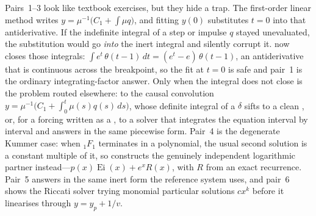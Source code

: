 \begin{codepairs}
\end{codepairs}

Pairs~1--3 look like textbook exercises, but they hide a trap. The first-order
linear method writes \(y=\mu^{-1}\bigl(C_1+\int\mu q\bigr)\), and fitting \(y(0)\)
substitutes \(t=0\) into that antiderivative. If the indefinite integral of a step
or impulse \(q\) stayed unevaluated, the substitution would go \emph{into} the inert
integral and silently corrupt it.  now closes those integrals:
\(\int e^{t}\,\theta(t-1)\,dt = (e^{t}-e)\,\theta(t-1)\), an antiderivative that is
continuous across the breakpoint, so the fit at \(t=0\) is safe and pair~1 is the
ordinary integrating-factor answer. Only when the integral does not close is the
problem routed elsewhere: to the causal convolution
\(y=\mu^{-1}\bigl(C_1+\int_0^t\mu(s)q(s)\,ds\bigr)\), whose definite integral of a
\(\delta\) sifts to a clean , or, for a forcing written as a
, to a solver that integrates the equation interval by interval
and answers in the same piecewise form. Pair~4 is the degenerate Kummer case: when
\({}_1F_1\) terminates in a polynomial, the usual second solution
 is a constant multiple of it, so  constructs the
genuinely independent logarithmic partner instead---\(p(x)\operatorname{Ei}(x)+e^x
R(x)\), with \(R\) from an exact recurrence. Pair~5 answers in the same inert form the
reference system uses, and pair~6 shows the Riccati solver trying monomial
particular solutions \(cx^k\) before it linearises through \(y=y_p+1/v\).

